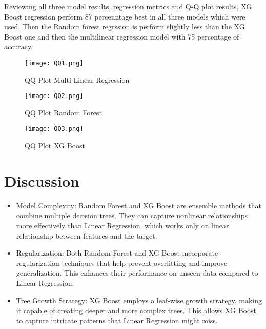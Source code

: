 \documentclass[12pt, a4paper,oneside]{book}
\numberwithin{equation}{section}
\begin{document}
Reviewing all three model results, regression metrics and Q-Q plot results, XG Boost regression perform 87 percenntage  best in all three models which were used. Then the Random forest regrssion is perform slightly less than the XG Boost one and then the multilinear regression model with 75 percentage of accuracy. 


 \begin{figure}[H]
\centerline{\texttt{[image: QQ1.png]}}
\caption{QQ Plot Multi Linear Regression}
\label{fig:4.2}
\end{figure}

 \begin{figure}[H]
\centerline{\texttt{[image: QQ2.png]}}
\caption{QQ Plot Random Forest}
\label{fig:4.2}
\end{figure}

 \begin{figure}[H]
\centerline{\texttt{[image: QQ3.png]}}
\caption{QQ Plot XG Boost}
\label{fig:4.2}
\end{figure}



\section{Discussion}

\begin{itemize}
    \item Model Complexity: Random Forest and XG Boost are ensemble methods that combine multiple decision trees. They can capture nonlinear relationships more effectively than Linear Regression, which works only on linear relationship between features and the target.
\end{itemize}

\begin{itemize}
    \item Regularization: Both Random Forest and XG Boost incorporate regularization techniques that help prevent overfitting and improve generalization. This enhances their performance on unseen data compared to Linear Regression.
\end{itemize}


\begin{itemize}
    \item Tree Growth Strategy: XG Boost employs a leaf-wise growth strategy, making it capable of creating deeper and more complex trees. This allows XG Boost to capture intricate patterns that Linear Regression might miss.
\end{itemize}
\end{document}
